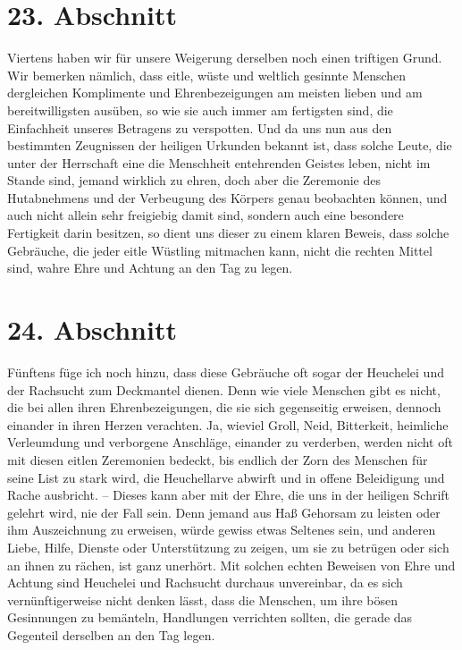 \section{23. Abschnitt} \label{kap9_ab23}

Viertens haben wir für unsere Weigerung derselben noch einen triftigen Grund.
Wir bemerken nämlich, dass eitle, wüste und weltlich gesinnte Menschen
dergleichen
Komplimente und Ehrenbezeigungen am meisten lieben und am bereitwilligsten
ausüben, so wie sie auch immer am fertigsten sind, die Einfachheit unseres
Betragens zu verspotten. Und da uns nun aus den bestimmten Zeugnissen der
heiligen Urkunden bekannt ist, dass solche Leute, die unter der Herrschaft eine
die Menschheit entehrenden Geistes leben, nicht im Stande sind, jemand wirklich
zu ehren, doch aber die Zeremonie des Hutabnehmens und der Verbeugung des
Körpers genau beobachten können, und auch nicht allein sehr freigiebig damit
sind, sondern auch eine besondere Fertigkeit darin besitzen, so dient uns
dieser zu einem klaren Beweis, dass solche Gebräuche, die jeder eitle Wüstling
mitmachen kann, nicht die rechten Mittel sind, wahre Ehre und Achtung an den Tag
zu legen.

\section{24. Abschnitt} \label{kap9_ab24}

Fünftens füge ich noch hinzu, dass diese Gebräuche oft sogar der
Heuchelei und
der Rachsucht zum Deckmantel dienen. Denn wie viele Menschen gibt es nicht, die
bei allen ihren Ehrenbezeigungen, die sie sich gegenseitig erweisen, dennoch
einander in ihren Herzen verachten. Ja, wieviel Groll, Neid, Bitterkeit,
heimliche Verleumdung und verborgene Anschläge, einander zu verderben, werden
nicht oft mit diesen eitlen Zeremonien bedeckt, bis endlich der Zorn des
Menschen für seine List zu stark wird, die Heuchellarve abwirft und in offene
Beleidigung und Rache ausbricht. -- Dieses kann aber mit der Ehre, die uns in
der heiligen Schrift gelehrt wird, nie der Fall sein. Denn jemand aus Haß
Gehorsam zu leisten oder ihm Auszeichnung zu erweisen, würde gewiss etwas
Seltenes sein, und anderen Liebe, Hilfe, Dienste oder Unterstützung zu zeigen,
um sie zu betrügen oder sich an ihnen zu rächen, ist ganz unerhört. Mit solchen
echten Beweisen von Ehre und Achtung sind Heuchelei und Rachsucht durchaus
unvereinbar, da es sich vernünftigerweise nicht denken lässt, dass die Menschen,
um ihre bösen Gesinnungen zu bemänteln, Handlungen verrichten sollten, die
gerade das Gegenteil derselben an den Tag legen.


